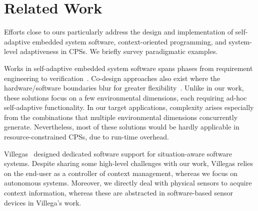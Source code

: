 \section{Related Work}
\label{sec:related}

Efforts close to ours particularly address the design and
implementation of self-adaptive embedded system software,
context-oriented programming, and system-level adaptiveness in
CPSs. We briefly survey paradigmatic examples.

Works in self-adaptive embedded system software
spans phases from requirement engineering to
verification~\cite{cheng:adaptive}. Co-design approaches also exist
where the hardware/software boundaries blur for greater
flexibility~\cite{diguet11:closed}. Unlike in our work, 
these solutions focus on a few environmental dimensions, each
requiring ad-hoc self-adaptive functionality. In our target
applications, complexity arises especially from the 
combinations that multiple environmental dimensions concurrently
generate. Nevertheless, most of these solutions would be hardly
applicable in resource-constrained CPSs, due to
run-time overhead.

Villegas~\cite{VilegasPhD13} designed dedicated software support for
situation-aware software systems. Despite sharing some high-level
challenges with our work, Villegas relies on the end-user as a
controller of context management, whereas we focus on autonomous
systems. Moreover, we directly deal with physical sensors to acquire
context information, whereas these are abstracted in software-based
sensor devices in Villega's work.


